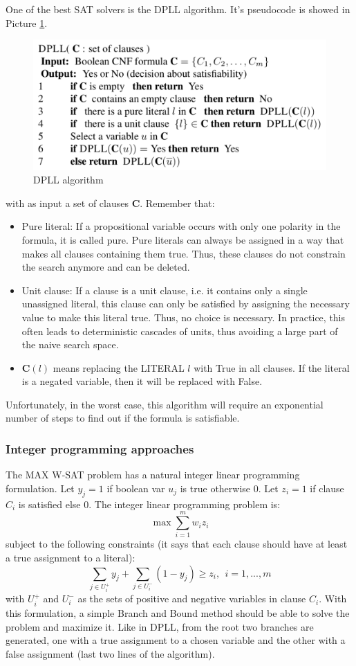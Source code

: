 \documentclass[10pt]{article}
\begin{document}
One of the best SAT solvers is the DPLL algorithm. It's pseudocode is showed in Picture \ref{fig:dpll}.

\begin{figure}[H]
\includegraphics[scale=0.5]{dpll}
\caption{DPLL algorithm}
\centering
\label{fig:dpll}
\end{figure}

with as input a set of clauses $\boldsymbol{C}$. Remember that:
\begin{itemize}
\item{Pure literal: If a propositional variable occurs with only one polarity in the formula, it is called pure. Pure literals can always be assigned in a way that makes all clauses containing them true. Thus, these clauses do not constrain the search anymore and can be deleted.}
\item{Unit clause: If a clause is a unit clause, i.e. it contains only a single unassigned literal, this clause can only be satisfied by assigning the necessary value to make this literal true. Thus, no choice is necessary. In practice, this often leads to deterministic cascades of units, thus avoiding a large part of the naive search space.}
\item{$\boldsymbol{C}(l)$ means replacing the LITERAL $l$ with True in all clauses. If the literal is a negated variable, then it will be replaced with False.}
\end{itemize}

Unfortunately, in the worst case, this algorithm will require an exponential number of steps to find out if the formula is satisfiable. 

\subsubsection{Integer programming approaches}
The MAX W-SAT problem has a natural integer linear programming formulation. Let $y_j = 1$ if boolean var $u_j$ is true otherwise $0$. Let $z_i = 1$ if clause $C_i$ is satisfied else $0$. The integer linear programming problem is:
$$
\max \sum_{i=1}^{m} w_i z_i
$$
subject to the following constraints (it says that each clause should have at least a true assignment to a literal):
$$
\sum_{j \in U_i^{+}} y_j + \sum_{j \in U_i^{-}} (1 - y_j) \geq z_i , \ \ i = 1,...,m
$$
with $U_i^{+}$ and $U_i^{-}$ as the sets of positive and negative variables in clause $C_i$. With this formulation, a simple Branch and Bound method should be able to solve the problem and maximize it. Like in DPLL, from the root two branches are generated, one with a true assignment to a chosen variable and the other with a false assignment (last two lines of the algorithm).
\end{document}
